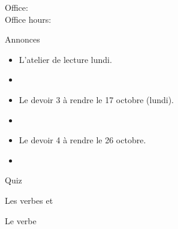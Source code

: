 \documentclass{beamer}
\subtitle[Carrières et verbes]{Les carrières et les verbes \lexi{pouvoir}, \lexi{devoir}, \lexi{vouloir}}
\begin{document}
  \begin{frame}
    \titlepage
    \tiny{Office: \\
          Office hours: }
  \end{frame}

  \begin{frame}{Annonces}
    \begin{itemize}
      \item L'atelier de lecture lundi.
      \item[] 
      \item Le devoir 3 à rendre le 17 octobre (lundi).
      \item[] 
      \item Le devoir 4 à rendre le 26 octobre.
      \item[] 
    \end{itemize}
  \end{frame}

  \begin{frame}{}
    \begin{center}
      \Large Quiz
    \end{center}
  \end{frame}

  \begin{frame}{Les verbes  et }
    \scriptsize
        \begin{center}
          \noindent
          \noindent
        \end{center}
  \end{frame}

  \begin{frame}{Le verbe }
    \begin{center}
      
    \end{center}
  \end{frame}
\end{document}
